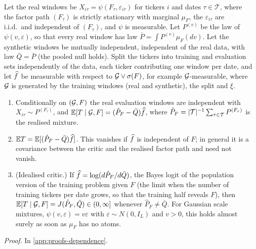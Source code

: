 \begin{proposition}\label{prop:ticker-bias}
Let the real windows be $X_{i\tau}=\psi(F_\tau,\varepsilon_{i\tau})$ for tickers $i$ and dates
$\tau\in\mathcal T$, where the factor path $(F_\tau)$ is strictly stationary with marginal $\mu_F$,
the $\varepsilon_{i\tau}$ are i.i.d.\ and independent of $(F_\tau)$, and $\psi$ is measurable. Let
$P^{(v)}$ be the law of $\psi(v,\varepsilon)$, so that every real window has law
$\bar P=\int P^{(v)}\mu_F(dv)$. Let the synthetic windows be mutually independent, independent of
the real data, with law $\bar Q=\bar P$ (the pooled null holds). Split the tickers into training
and evaluation sets independently of the data, each ticker contributing one window per date, and
let $\widehat{f}$ be measurable with respect to $\mathcal{G}\vee\sigma(F)$, for example $\mathcal{G}$-measurable,
where $\mathcal{G}$ is generated by the training windows (real and synthetic), the split and $\xi$.
\begin{enumerate}
  \item[(a)] Conditionally on $(\mathcal{G},F)$ the real evaluation windows are independent with
  $X_{i\tau}\sim P^{(F_\tau)}$, and $\mathbb{E}[T\mid\mathcal{G},F]=(\hat P_F-\bar Q)\widehat{f}$, where
  $\hat P_F=\lvert\mathcal T\rvert^{-1}\sum_{\tau\in\mathcal T}P^{(F_\tau)}$ is the realised mixture.
  \item[(b)] $\mathbb{E} T=\mathbb{E}[(\hat P_F-\bar Q)\widehat{f}]$. This vanishes if $\widehat{f}$ is independent of $F$;
  in general it is a covariance between the critic and the realised factor path and need not
  vanish.
  \item[(c)] (Idealised critic.) If $\widehat{f}=\log(d\hat P_F/d\bar Q)$, the Bayes logit of the
  population version of the training problem given $F$ (the limit when the number of training
  tickers per date grows, so that the training half reveals $F$), then
  $\mathbb{E}[T\mid\mathcal{G},F]=J(\hat P_F,\bar Q)\in(0,\infty]$ whenever $\hat P_F\neq\bar Q$. For Gaussian
  scale mixtures, $\psi(v,\varepsilon)=v\varepsilon$ with $\varepsilon\sim N(0,I_L)$ and $v>0$, this
  holds almost surely as soon as $\mu_F$ has no atoms.
\end{enumerate}
\end{proposition}
\noindent\textit{Proof.} In \cref{app:proofs-dependence}.

